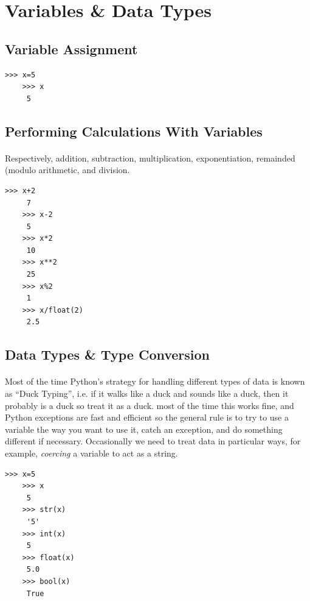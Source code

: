 \documentclass[12pt, a4paper, oneside]{book}
\begin{document}
{\section{Variables \& Data Types}

\subsection{Variable Assignment}
\begin{lstlisting}[style=DOS]
    >>> x=5
    >>> x
     5
\end{lstlisting}

\subsection{Performing Calculations With Variables}
\paragraph{} Respectively, addition, subtraction, multiplication, exponentiation, remainded (modulo arithmetic, and division.
\begin{lstlisting}[style=DOS]
    >>> x+2
     7
    >>> x-2
     5
    >>> x*2
     10
    >>> x**2
     25
    >>> x%2
     1
    >>> x/float(2)
     2.5
\end{lstlisting}

\subsection{Data Types \& Type Conversion}
\paragraph{} Most of the time Python's strategy for handling different types of data is known as ``Duck Typing'', i.e. if it walks like a duck and sounds like a duck, then it probably is a duck so treat it as a duck. most of the time this works fine, and Python exceptions are fast and efficient so the general rule is to try to use a variable the way you want to use it, catch an exception, and do something different if necessary. Occasionally we need to treat data in particular ways, for example, \emph{coercing} a variable to act as a string. 

\begin{lstlisting}[style=DOS]
    >>> x=5
    >>> x
     5
    >>> str(x)
     '5'
    >>> int(x)
     5
    >>> float(x)
     5.0
    >>> bool(x)
     True
\end{lstlisting}
}
\end{document}
